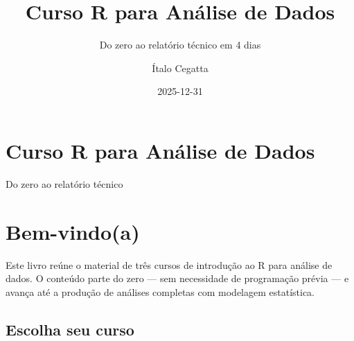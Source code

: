 \documentclass[
  letterpaper,
]{scrbook}
\title{Curso R para Análise de Dados}
\subtitle{Do zero ao relatório técnico em 4 dias}
\author{Ítalo Cegatta}
\date{2025-12-31}
\renewcommand*\contentsname{Table of contents}
\newcommand\contentsname{Table of contents}
\begin{document}
\frontmatter
\maketitle

\renewcommand*\contentsname{Table of contents}
{
\setcounter{tocdepth}{1}
\tableofcontents
}

\mainmatter
{}

\chapter{Curso R para Análise de
Dados}\label{curso-r-para-anuxe1lise-de-dados}

Do zero ao relatório técnico

\hfill\break


\chapter*{Bem-vindo(a)}\label{bem-vindoa}


Este livro reúne o material de três cursos de introdução ao R para
análise de dados. O conteúdo parte do zero --- sem necessidade de
programação prévia --- e avança até a produção de análises completas com
modelagem estatística.

\section{Escolha seu curso}\label{escolha-seu-curso}
\end{document}
